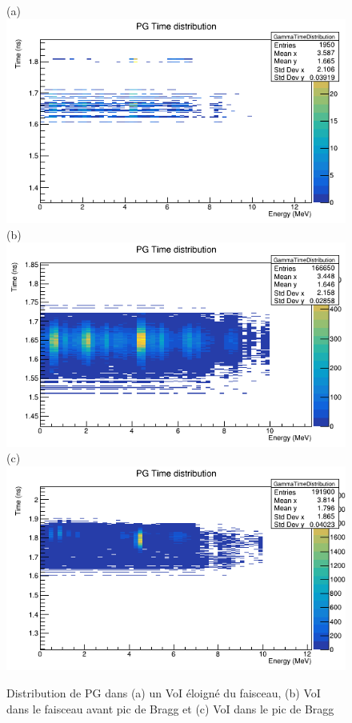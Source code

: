 \documentclass[11pt,a4paper,oldfontcommands]{memoir}
\begin{document}
\begin{figure}[h!]

\centering
\subfloat(a){\includegraphics[scale=0.3]{Parodi/PG/away.png}}
\subfloat(b){\includegraphics[scale=0.3]{Parodi/PG/preBragg.png}}\\
\subfloat(c){\includegraphics[scale=0.3]{Parodi/PG/Bragg.png}}
    
\caption{ Distribution de PG dans (a) un VoI éloigné du faisceau, (b) VoI dans le faisceau avant pic de Bragg et (c) VoI dans le pic de Bragg }
\label{hetero pg}
\end{figure}
\end{document}
